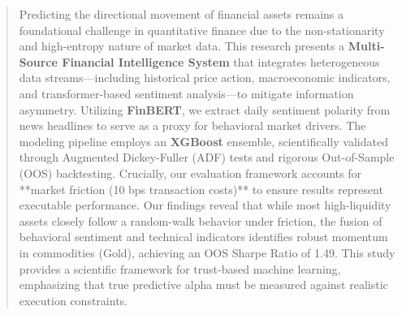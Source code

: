 \begin{abstract}
    Predicting the directional movement of financial assets remains a foundational challenge in quantitative finance due to the non-stationarity and high-entropy nature of market data. This research presents a \textbf{Multi-Source Financial Intelligence System} that integrates heterogeneous data streams---including historical price action, macroeconomic indicators, and transformer-based sentiment analysis---to mitigate information asymmetry. Utilizing \textbf{FinBERT}, we extract daily sentiment polarity from news headlines to serve as a proxy for behavioral market drivers. The modeling pipeline employs an \textbf{XGBoost} ensemble, scientifically validated through Augmented Dickey-Fuller (ADF) tests and rigorous Out-of-Sample (OOS) backtesting. Crucially, our evaluation framework accounts for **market friction (10 bps transaction costs)** to ensure results represent executable performance. Our findings reveal that while most high-liquidity assets closely follow a random-walk behavior under friction, the fusion of behavioral sentiment and technical indicators identifies robust momentum in commodities (Gold), achieving an OOS Sharpe Ratio of 1.49. This study provides a scientific framework for trust-based machine learning, emphasizing that true predictive alpha must be measured against realistic execution constraints.
\end{abstract}